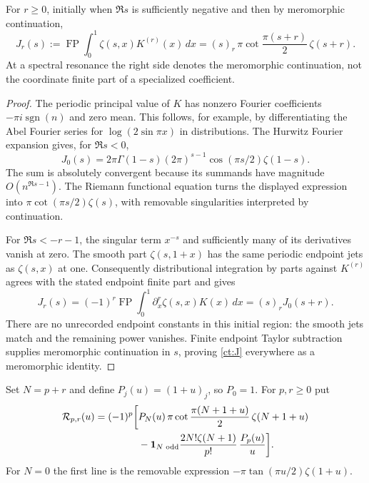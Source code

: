 \begin{lemma}
\label{ct:transform}
For $r\ge0$, initially when $\Re s$ is sufficiently negative and then by
meromorphic continuation,
\begin{equation}\label{ct:J}
 J_r(s):=\operatorname{FP}\int_0^1\zeta(s,x)K^{(r)}(x)\,dx
 =(s)_r\,\pi\cot\frac{\pi(s+r)}2\,\zeta(s+r).
\end{equation}
At a spectral resonance the right side denotes the meromorphic
continuation, not the coordinate finite part of a specialized
coefficient.
\end{lemma}
\begin{proof}
The periodic principal value of $K$ has nonzero Fourier coefficients
$-\pi i\operatorname{sgn}(n)$ and zero mean. This follows, for example,
by differentiating the Abel Fourier series for
$\log(2\sin\pi x)$ in distributions. The Hurwitz Fourier expansion \cite[Eq.~25.11.9]{DLMFHurwitz} gives,
for $\Re s<0$,
\[
 J_0(s)=2\pi\Gamma(1-s)(2\pi)^{s-1}
             \cos(\pi s/2)\zeta(1-s).
\]
The sum is absolutely convergent because its summands have magnitude
$O(n^{\Re s-1})$. The Riemann functional equation \cite{DLMFZetaReflection} turns the displayed
expression into $\pi\cot(\pi s/2)\zeta(s)$, with removable singularities
interpreted by continuation.

For $\Re s<-r-1$, the singular term $x^{-s}$ and sufficiently many
of its derivatives vanish at zero. The smooth part
$\zeta(s,1+x)$ has the same periodic endpoint jets as $\zeta(s,x)$ at
one. Consequently distributional integration by parts against
$K^{(r)}$ agrees with the stated endpoint finite part and gives
\[
 J_r(s)=(-1)^r\operatorname{FP}\int_0^1
              \partial_x^r\zeta(s,x)K(x)\,dx
       =(s)_rJ_0(s+r).
\]
There are no unrecorded endpoint constants in this initial region:
the smooth jets match and the remaining power vanishes. Finite endpoint
Taylor subtraction supplies meromorphic continuation in $s$, proving
\eqref{ct:J} everywhere as a meromorphic identity.
\end{proof}

Set $N=p+r$ and define $P_j(u)=(1+u)_j$, so $P_0=1$.
For $p,r\ge0$ put
\begin{align}
 \mathcal R_{p,r}(u)
 =(-1)^p\bigg[&P_N(u)\,
      \pi\cot\frac{\pi(N+1+u)}2\,\zeta(N+1+u)\notag\\
 &-\mathbf1_{N\text{ odd}}
      \frac{2N!\zeta(N+1)}{p!}\,\frac{P_p(u)}u\bigg].
 \label{ct:R}
\end{align}
For $N=0$ the first line is the removable expression
$-\pi\tan(\pi u/2)\zeta(1+u)$.

